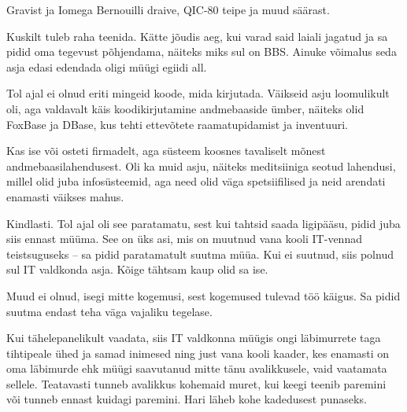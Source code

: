 
Gravist ja Iomega Bernouilli draive, QIC-80 
teipe ja muud säärast.


Kuskilt tuleb raha teenida. Kätte jõudis aeg, kui varad said laiali 
jagatud ja sa pidid oma tegevust põhjendama, näiteks miks sul on 
BBS. Ainuke võimalus seda asja edasi edendada oligi müügi 
egiidi all.


Tol ajal ei olnud eriti mingeid koode, mida kirjutada. Väikseid asju loomulikult oli, aga valdavalt käis koodikirjutamine 
andmebaaside ümber, näiteks olid FoxBase ja DBase, kus tehti 
ettevõtete raamatupidamist ja inventuuri. 


Kas ise või osteti firmadelt, aga süsteem koosnes tavaliselt 
mõnest andmebaasilahendusest. Oli ka muid asju, 
näiteks meditsiiniga seotud lahendusi, millel olid juba infosüsteemid, aga 
need olid väga spetsiifilised ja neid arendati enamasti väikses mahus.


Kindlasti. Tol ajal oli see paratamatu, sest kui tahtsid 
saada ligipääsu, pidid juba siis ennast müüma. See on üks asi, mis on muutnud 
vana kooli IT-vennad teistsuguseks -- sa pidid paratamatult suutma müüa. Kui ei suutnud, siis polnud sul IT valdkonda asja. Kõige 
tähtsam kaup olid sa ise.


Muud ei olnud, isegi mitte kogemusi, sest kogemused tulevad töö käigus. Sa pidid suutma endast teha väga vajaliku tegelase.


Kui tähelepanelikult vaadata, siis IT valdkonna müügis ongi 
läbimurrete taga tihtipeale ühed ja samad inimesed ning just 
vana kooli kaader, kes enamasti on oma läbimurde ehk müügi saavutanud mitte 
tänu avalikkusele, vaid vaatamata sellele. Teatavasti tunneb avalikkus 
kohemaid muret, kui keegi teenib paremini või tunneb ennast kuidagi paremini. 
Hari läheb kohe kadedusest punaseks.

